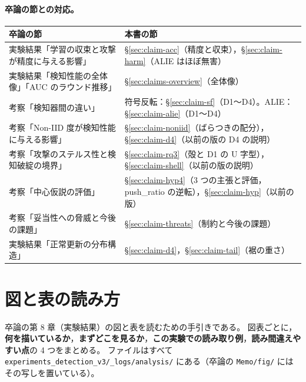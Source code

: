 \documentclass[a4j, dvipdfmx]{jsarticle}  %
\begin{document}
\paragraph{卒論の節との対応。}
\begin{table}[H]
\centering
\begin{tabular}{@{}P{6.6cm} P{8.7cm}@{}}
\toprule
卒論の節 & 本書の節 \\
\midrule
実験結果「学習の収束と攻撃が精度に与える影響」 & \S\ref{sec:claim-acc}（精度と収束），\S\ref{sec:claim-harm}（ALIE はほぼ無害） \\
実験結果「検知性能の全体像」「AUC のラウンド推移」 & \S\ref{sec:claims-overview}（全体像） \\
考察「検知器間の違い」 & 符号反転：\S\ref{sec:claim-sf}（D1〜D4）。ALIE：\S\ref{sec:claim-alie}（D1〜D4） \\
考察「Non-IID 度が検知性能に与える影響」 & \S\ref{sec:claim-noniid}（ばらつきの配分），\S\ref{sec:claim-d4}（以前の版の D4 の説明） \\
考察「攻撃のステルス性と検知破綻の境界」 & \S\ref{sec:claim-rq3}（殻と D1 の U 字型），\S\ref{sec:claim-shell}（以前の版の説明） \\
考察「中心仮説の評価」 & \S\ref{sec:claim-hyp4}（3 つの主張と評価，push\_ratio の逆転），\S\ref{sec:claim-hyp}（以前の版） \\
考察「妥当性への脅威と今後の課題」 & \S\ref{sec:claim-threats}（制約と今後の課題） \\
実験結果「正常更新の分布構造」 & \S\ref{sec:claim-d4}，\S\ref{sec:claim-tail}（裾の重さ） \\
\bottomrule
\end{tabular}
\end{table}

\section{図と表の読み方}
\label{sec:claims-reading}

卒論の第 8 章（実験結果）の図と表を読むための手引きである。
図表ごとに，\textbf{何を描いているか}，\textbf{まずどこを見るか}，\textbf{この実験での読み取り例}，\textbf{読み間違えやすい点}の 4 つをまとめる。
ファイルはすべて \texttt{experiments\_detection\_v3/\_logs/analysis/} にある（卒論の \texttt{Memo/fig/} にはその写しを置いている）。
\end{document}
